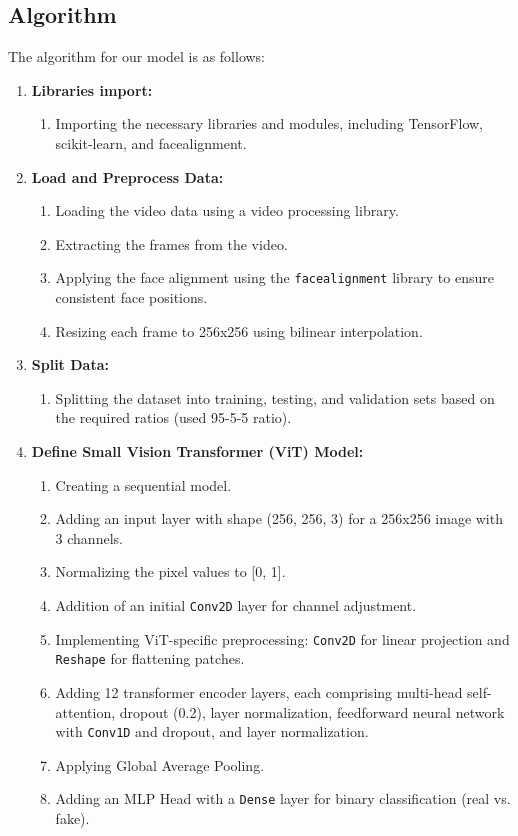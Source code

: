 \subsection{Algorithm}
The algorithm  for our model is as follows:

\begin{enumerate}
    \item \textbf{Libraries import:}
          \begin{enumerate}
             \item Importing the necessary libraries and modules, including TensorFlow, scikit-learn, and facealignment.
          \end{enumerate}
 
    \item \textbf{Load and Preprocess Data:}
          \begin{enumerate}
             \item Loading the video data using a video processing library.
             \item Extracting the frames from the video.
             \item Applying the face alignment using the \texttt{facealignment} library to ensure consistent face positions.
             \item Resizing each frame to 256x256 using bilinear interpolation.
          \end{enumerate}
 
    \item \textbf{Split Data:}
          \begin{enumerate}
             \item Splitting the dataset into training, testing, and validation sets based on the required ratios (used 95-5-5 ratio).
          \end{enumerate}
 
    \item \textbf{Define Small Vision Transformer (ViT) Model:}
          \begin{enumerate}
             \item Creating a sequential model.
             \item Adding an input layer with shape (256, 256, 3) for a 256x256 image with 3 channels.
             \item Normalizing the pixel values to [0, 1].
             \item Addition of an initial \texttt{Conv2D} layer for channel adjustment.
             \item Implementing ViT-specific preprocessing: \texttt{Conv2D} for linear projection and \texttt{Reshape} for flattening patches.
             \item Adding 12 transformer encoder layers, each comprising multi-head self-attention, dropout (0.2), layer normalization, feedforward neural network with \texttt{Conv1D} and dropout, and layer normalization.
             \item Applying Global Average Pooling.
             \item Adding an MLP Head with a \texttt{Dense} layer for binary classification (real vs. fake).
          \end{enumerate}
 

\end{enumerate}

